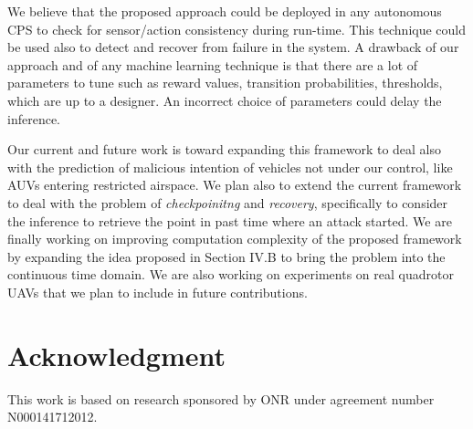 \documentclass[letterpaper, 10 pt, conference]{ieeeconf}  %
\newcommand\NB[1]{$\spadesuit$\footnote{NB: #1}}
\begin{document}
We believe that the proposed approach could be deployed in any autonomous CPS to check for sensor/action consistency during run-time. This technique could be used also to detect and recover from failure in the system. A drawback of our approach and of any machine learning technique is that there are a lot of parameters to tune such as reward values, transition probabilities, thresholds, which are up to a designer. An incorrect choice of parameters could delay the inference. 

Our current and future work is toward expanding this framework to deal also with the prediction of malicious intention of vehicles not under our control, like AUVs entering restricted airspace. We plan also to extend the current framework to deal with the problem of {\em checkpoinitng} and {\em recovery}, specifically to consider the inference to retrieve the point in past time where an attack started.
We are finally working on improving computation complexity of the proposed framework by expanding the idea proposed in Section IV.B to bring the problem into the continuous time domain.
We are also working on experiments on real quadrotor UAVs that we plan to include in future contributions.


%
%
\section*{Acknowledgment}
This work is based on research sponsored by ONR under agreement number N000141712012.
\end{document}

